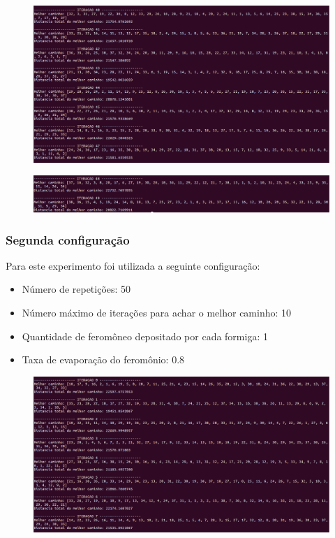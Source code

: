 \documentclass[hidelinks,12pt]{article}
\begin{document}
		\newpage

		\begin{figure}[!h]
			\centering
			\includegraphics[scale=0.3]{Figures/m38-1-6.png}
		\end{figure}

		\newpage

		\begin{figure}[!h]
			\centering
			\includegraphics[scale=0.3]{Figures/m38-1-7.png}
		\end{figure}
		
		\newpage
		
		\subsubsection{Segunda configuração}
		 	Para este experimento foi utilizada a seguinte configuração:

		 	\begin{itemize}
				\item Número de repetições: 50
				\item Número máximo de iterações para achar o melhor caminho: 10
				\item Quantidade de feromôneo depositado por cada formiga: 1
				\item Taxa de evaporação do feromônio: 0.8
			\end{itemize}

		\newpage

		\begin{figure}[!h]
			\centering
			\includegraphics[scale=0.3]{Figures/m38-2-1.png}
		\end{figure}
\end{document}
